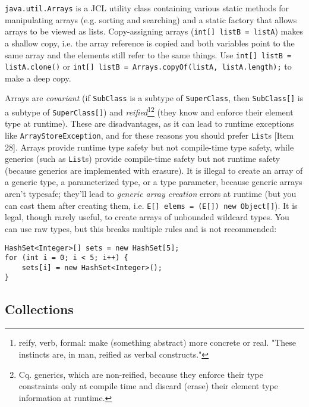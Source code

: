 \documentclass[8pt, table, xcdraw]{article}%
\begin{document}
\lstinline{java.util.Arrays} is a JCL utility class containing various static methods for manipulating arrays (e.g. sorting and searching) and a static factory that allows arrays to be viewed as lists. Copy-assigning arrays (\lstinline{int[] listB = listA}) makes a shallow copy, i.e. the array reference is copied and both variables point to the same array and the elements still refer to the same things. Use \lstinline{int[] listB = listA.clone()} or \lstinline{int[] listB = Arrays.copyOf(listA, listA.length);} to make a deep copy.

Arrays are \emph{covariant} (if \lstinline{SubClass} is a subtype of \lstinline{SuperClass}, then \lstinline{SubClass[]} is a subtype of \lstinline{SuperClass[]}) and \emph{reified}\footnote{reify, verb, formal: make (something abstract) more concrete or real. "These instincts are, in man, reified as verbal constructs."}\footnote{Cq. generics, which are non-reified, because they enforce their type constraints only at compile time and discard (erase) their element type information at runtime.} (they know and enforce their element type at runtime). These are disadvantages, as it can lead to runtime exceptions like \lstinline{ArrayStoreException}, and for these reasons you should prefer \lstinline{List}s [Item 28]. Arrays provide runtime type safety but not compile-time type safety, while generics (such as \lstinline{List}s) provide compile-time safety but not runtime safety (because generics are implemented with erasure). It is illegal to create an array of a generic type, a parameterized type, or a type parameter, because generic arrays aren't typesafe; they'll lead to \emph{generic array creation} errors at runtime (but you can cast them after creating them, i.e. \lstinline{E[] elems = (E[]) new Object[]}). It is legal, though rarely useful, to create arrays of unbounded wildcard types. You can use raw types, but this breaks multiple rules and is not recommended:

\begin{lstlisting}
HashSet<Integer>[] sets = new HashSet[5];
for (int i = 0; i < 5; i++) {
    sets[i] = new HashSet<Integer>();
}
\end{lstlisting}

\subsection{Collections}
\end{document}

